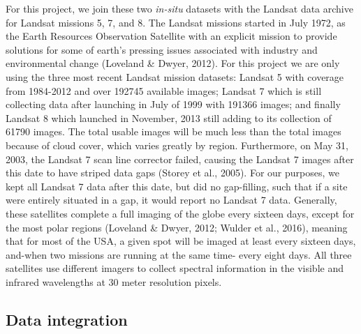 \documentclass[]{article}
\begin{document}
For this project, we join these two \emph{in-situ} datasets with the
Landsat data archive for Landsat missions 5, 7, and 8. The Landsat
missions started in July 1972, as the Earth Resources Observation
Satellite with an explicit mission to provide solutions for some of
earth's pressing issues associated with industry and environmental
change (Loveland \& Dwyer, 2012). For this project we are only using the
three most recent Landsat mission datasets: Landsat 5 with coverage from
1984-2012 and over 192745 available images; Landsat 7 which is still
collecting data after launching in July of 1999 with 191366 images; and
finally Landsat 8 which launched in November, 2013 still adding to its
collection of 61790 images. The total usable images will be much less
than the total images because of cloud cover, which varies greatly by
region. Furthermore, on May 31, 2003, the Landsat 7 scan line corrector
failed, causing the Landsat 7 images after this date to have striped
data gaps (Storey et al., 2005). For our purposes, we kept all Landsat 7
data after this date, but did no gap-filling, such that if a site were
entirely situated in a gap, it would report no Landsat 7 data.
Generally, these satellites complete a full imaging of the globe every
sixteen days, except for the most polar regions (Loveland \& Dwyer,
2012; Wulder et al., 2016), meaning that for most of the USA, a given
spot will be imaged at least every sixteen days, and-when two missions
are running at the same time- every eight days. All three satellites use
different imagers to collect spectral information in the visible and
infrared wavelengths at 30 meter resolution pixels.

\hypertarget{data-integration}{%
\subsection{Data integration}\label{data-integration}}
\end{document}

